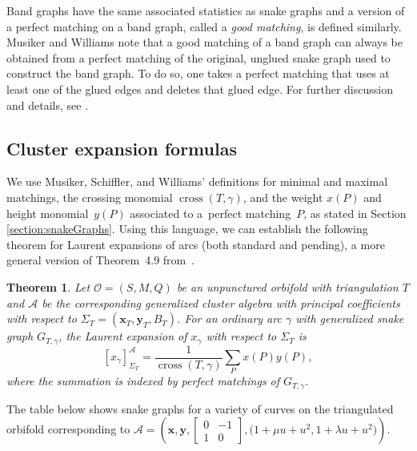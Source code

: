 \documentclass[pdftex]{sigma}%
\numberwithin{equation}{section}
\newtheorem{Theorem}{Theorem}[section]
\begin{document}
Band graphs have the same associated statistics as snake graphs and a version of a perfect matching on a band graph, called a \emph{good matching}, is defined similarly. Musiker and Williams note that a good matching of a band graph can always be obtained from a perfect matching of the original, unglued snake graph used to construct the band graph. To do so, one takes a perfect matching that uses at least one of the glued edges and deletes that glued edge. For further discussion and details, see \cite[Section~3]{MW}.

\subsection{Cluster expansion formulas}

We use Musiker, Schiffler, and Williams' definitions for minimal and maximal matchings, the crossing monomial $\operatorname{cross}(T,\gamma)$, and the weight $x(P)$ and height monomial~$y(P)$ associated to a~perfect matching~$P$, as stated in Section \ref{section:snakeGraphs}. Using this language, we can establish the following theorem for Laurent expansions of arcs (both standard and pending), a more general version of Theorem~4.9 from~\cite{MSW}.

\begin{Theorem}\label{Thm:GenSnake+}
Let $\mathcal{O} = (S,M,Q)$ be an unpunctured orbifold with triangulation $T$ and $\mathcal{A}$ be the corresponding generalized cluster algebra with principal coefficients with respect to $\Sigma_T = (\mathbf{x}_T,\mathbf{y}_T,B_T)$. For an ordinary arc $\gamma$ with generalized snake graph $G_{T,\gamma}$, the Laurent expansion of $x_\gamma$ with respect to $\Sigma_T$ is
\[ [x_\gamma]^{\mathcal{A}}_{\Sigma_T} = \frac{1}{\operatorname{cross}(T,\gamma)} \sum_P x(P)y(P), \]
where the summation is indexed by perfect matchings of $G_{T,\gamma}$.
\end{Theorem}

\begin{Example}
 The table below shows snake graphs for a variety of curves on the triangulated orbifold corresponding to $\mathcal{A} = \left(\mathbf{x},\mathbf{y}, \left[\begin{smallmatrix} 0 & -1 \\ 1 & 0 \end{smallmatrix}\right], \big(1+\mu u + u^2, 1 + \lambda u + u^2\big) \right)$.
\end{Example}
\end{document}
